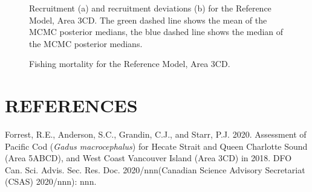 \documentclass[11pt]{book}
\begin{document}
\begin{figure}[htb]

{\centering {} 

}

\caption{Recruitment (a) and recruitment deviations (b) for the Reference Model, Area 3CD.  The green dashed line shows the mean of the MCMC posterior medians, the blue dashed line shows the median of the MCMC posterior medians.}\label{fig:fig-base-recr-3cd}
\end{figure}
\begin{figure}[htb]

{\centering {} 

}

\caption{Fishing mortality for the Reference Model, Area 3CD.}\label{fig:fig-base-f-3cd}
\end{figure}
\clearpage

\hypertarget{references}{%
\section*{REFERENCES}\label{references}}
{}
\noindent
\vspace{-2em}
\setlength{\parindent}{-0.2in}
\setlength{\leftskip}{0.2in}
\setlength{\parskip}{8pt}

\hypertarget{refs}{}
\leavevmode\hypertarget{ref-forrest2020}{}%
Forrest, R.E., Anderson, S.C., Grandin, C.J., and Starr, P.J. 2020. Assessment of Pacific Cod (\emph{Gadus macrocephalus}) for Hecate Strait and Queen Charlotte Sound (Area 5ABCD), and West Coast Vancouver Island (Area 3CD) in 2018. DFO Can. Sci. Advis. Sec. Res. Doc. 2020/nnn(Canadian Science Advisory Secretariat (CSAS) 2020/nnn): nnn.

\setlength{\parindent}{0in} \setlength{\leftskip}{0in} \setlength{\parskip}{4pt}

\end{document}
